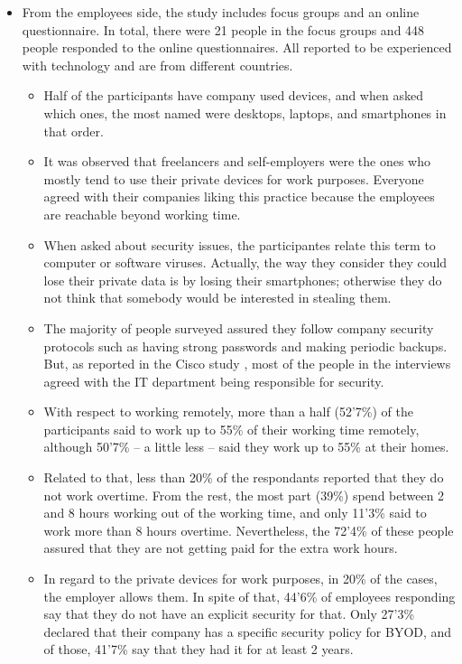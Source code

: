 \begin{itemize}
	\item From the employees side, the study includes focus groups and an online questionnaire. In total, there were 21 people in the focus groups and 448 people responded to the online questionnaires. All reported to be experienced with technology and are from different countries.
	\begin{itemize}
		\item Half of the participants have company used devices, and when asked which ones, the most named were desktops, laptops, and smartphones in that order.
		\item It was observed that freelancers and self-employers were the ones who mostly tend to use their private devices for work purposes. Everyone agreed with their companies liking this practice because the employees are reachable beyond working time.
		\item When asked about security issues, the participantes relate this term to computer or software viruses. Actually, the way they consider they could lose their private data is by losing their smartphones; otherwise they do not think that somebody would be interested in stealing them.
		\item The majority of people surveyed assured they follow company security protocols such as having strong passwords and making periodic backups. But, as reported in the Cisco study \cite{cisco2012}, most of the people in the interviews agreed with the IT department being responsible for security.
		\item With respect to working remotely, more than a half (52'7\%) of the participants said to work up to 55\% of their working time remotely, although 50'7\% -- a little less -- said they work up to 55\% at their homes.
		\item Related to that, less than 20\% of the respondants reported that they do not work overtime. From the rest, the most part (39\%) spend between 2 and 8 hours working out of the working time, and only 11'3\% said to work more than 8 hours overtime. Nevertheless, the 72'4\% of these people assured that they are not getting paid for the extra work hours.
		\item In regard to the private devices for work purposes, in 20\% of the cases, the employer allows them. In spite of that, 44'6\% of employees responding say that they do not have an explicit security for that. Only 27'3\% declared that their company has a specific security policy for BYOD, and of those, 41'7\% say that they had it for at least 2 years.

\end{itemize}
\end{itemize}
